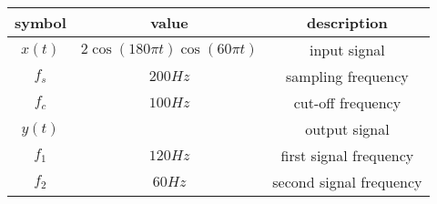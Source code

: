 
\begin{tabular}{|c|c|c|}
	\hline
	\textbf{symbol} & \textbf{value} & \textbf{description} \\
	\hline
	$x(t)$ & $2\cos{(180\pi t)}\cos{(60\pi t)}$ & input signal \\
	\hline
	$f_s$ & $200Hz$ & sampling frequency \\
	\hline
	$f_c$ & $100Hz$ & cut-off frequency \\
	\hline
	$y(t)$ &  & output signal \\
	\hline
	$f_1$ & $120Hz$ & first signal frequency \\
	\hline
	$f_2$ & $60Hz$ & second signal frequency \\
	\hline
\end{tabular}
